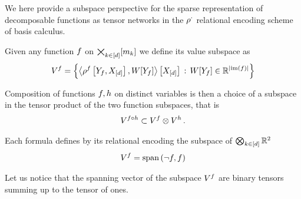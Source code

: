 \label{sec:HT}


We here provide a subspace perspective for the sparse representation of decomposable functions as tensor networks in the $\rho^{\cdot}$ relational encoding scheme of basis calculus.

\begin{definition}
    Given any function $f$ on $\bigtimes_{k\in[d]}[m_{k}]$ we define its value subspace as
    \[ V^{f}
    = \left\{\left\langle \rho^{f}\left[Y_{f},X_{[d]}\right],W[Y_{f}]\right\rangle \left[ X_{[d]} \right] \, : \, W[Y_{f}] \in \mathbb{R}^{\left|\mathrm{im}\left(f\right)\right|} \right\} \]
\end{definition}

Composition of functions $f,h$ on distinct variables is then a choice of a subspace in the tensor product of the two function subspaces, that is
\begin{align}
    V^{f\circ h}
    \subset V^{f} \otimes V^{h} \, .
\end{align}







Each formula defines by its relational encoding the subspace of $\bigotimes_{k\in[d]}\mathbb{R}^2$
\begin{align}
    \subspaceof{\exformula} = \spanof{\lnot\exformula,\exformula} %
\end{align}

Let us notice that the spanning vector of the subspace $V^{f}$ are binary tensors summing up to the tensor of ones.


